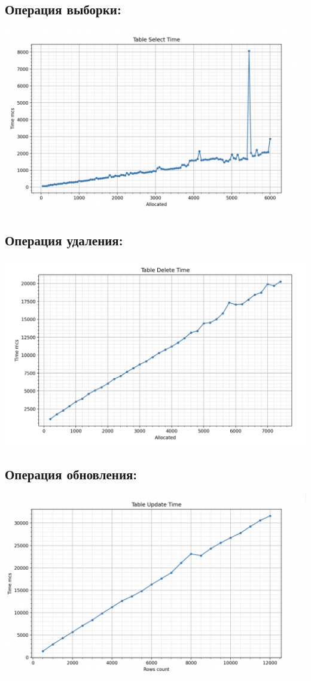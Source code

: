 \documentclass[12pt,onecolumn]{article}
\begin{document}
\subsection{Операция выборки:}
\includegraphics[width=\textwidth]{image/select.png}
\subsection{Операция удаления:}
\includegraphics[width=\textwidth]{image/delete.png}
\subsection{Операция обновления:}
\includegraphics[width=\textwidth]{image/update.png}
\end{document}
